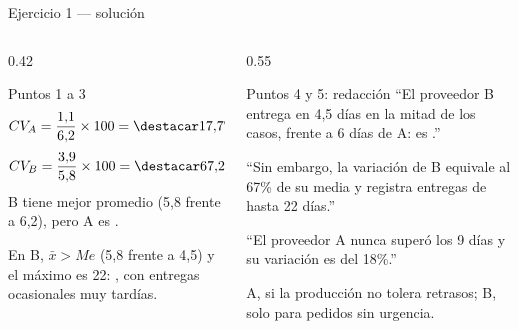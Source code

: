 \documentclass[aspectratio=169,10pt]{beamer}
\begin{document}
\begin{frame}{Ejercicio 1 — solución}
  \scriptsize
  \begin{columns}[T,onlytextwidth]
    \begin{column}{0.42\textwidth}
      \begin{exampleblock}{Puntos 1 a 3}
        \scriptsize
        \[ CV_A = \frac{1{,}1}{6{,}2}\times100 = \destacar{17{,}7\%} \]
        \[ CV_B = \frac{3{,}9}{5{,}8}\times100 = \destacar{67{,}2\%} \]
        B tiene mejor promedio (5,8 frente a 6,2), pero A es
        .

        \vspace{0.1cm}
        En B, $\bar{x} > Me$ (5,8 frente a 4,5) y el máximo es 22:
        , con entregas ocasionales muy
        tardías.
      \end{exampleblock}
    \end{column}
    \begin{column}{0.55\textwidth}
      \begin{block}{Puntos 4 y 5: redacción}
        \scriptsize
        ``El proveedor B entrega en 4,5 días en la mitad de los casos, frente a
        6 días de A: es .''

        \vspace{0.08cm}
        ``Sin embargo, la variación de B equivale al 67\% de su media y
        registra entregas de hasta 22 días.''

        \vspace{0.08cm}
        ``El proveedor A nunca superó los 9 días y su variación es del 18\%.''

        \vspace{0.1cm}
         A, si la producción no tolera retrasos; B,
        solo para pedidos sin urgencia.
      \end{block}
    \end{column}
  \end{columns}
\end{frame}

\end{document}
